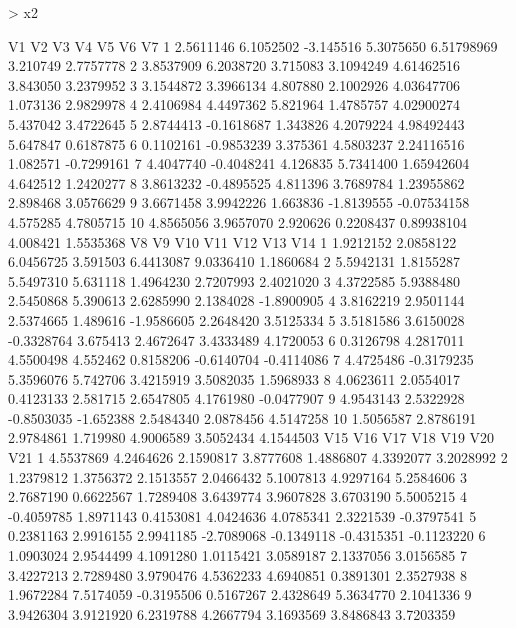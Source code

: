 \documentclass[12pt]{article}
\begin{document}
\begin{Schunk}
\begin{Sinput}
> x2
\end{Sinput}
\begin{Soutput}
          V1         V2        V3         V4          V5       V6         V7
1  2.5611146  6.1052502 -3.145516  5.3075650  6.51798969 3.210749  2.7757778
2  3.8537909  6.2038720  3.715083  3.1094249  4.61462516 3.843050  3.2379952
3  3.1544872  3.3966134  4.807880  2.1002926  4.03647706 1.073136  2.9829978
4  2.4106984  4.4497362  5.821964  1.4785757  4.02900274 5.437042  3.4722645
5  2.8744413 -0.1618687  1.343826  4.2079224  4.98492443 5.647847  0.6187875
6  0.1102161 -0.9853239  3.375361  4.5803237  2.24116516 1.082571 -0.7299161
7  4.4047740 -0.4048241  4.126835  5.7341400  1.65942604 4.642512  1.2420277
8  3.8613232 -0.4895525  4.811396  3.7689784  1.23955862 2.898468  3.0576629
9  3.6671458  3.9942226  1.663836 -1.8139555 -0.07534158 4.575285  4.7805715
10 4.8565056  3.9657070  2.920626  0.2208437  0.89938104 4.008421  1.5535368
          V8         V9        V10       V11        V12        V13        V14
1  1.9212152  2.0858122  6.0456725  3.591503  6.4413087  9.0336410  1.1860684
2  5.5942131  1.8155287  5.5497310  5.631118  1.4964230  2.7207993  2.4021020
3  4.3722585  5.9388480  2.5450868  5.390613  2.6285990  2.1384028 -1.8900905
4  3.8162219  2.9501144  2.5374665  1.489616 -1.9586605  2.2648420  3.5125334
5  3.5181586  3.6150028 -0.3328764  3.675413  2.4672647  3.4333489  4.1720053
6  0.3126798  4.2817011  4.5500498  4.552462  0.8158206 -0.6140704 -0.4114086
7  4.4725486 -0.3179235  5.3596076  5.742706  3.4215919  3.5082035  1.5968933
8  4.0623611  2.0554017  0.4123133  2.581715  2.6547805  4.1761980 -0.0477907
9  4.9543143  2.5322928 -0.8503035 -1.652388  2.5484340  2.0878456  4.5147258
10 1.5056587  2.8786191  2.9784861  1.719980  4.9006589  3.5052434  4.1544503
          V15       V16        V17        V18        V19        V20        V21
1   4.5537869 4.2464626  2.1590817  3.8777608  1.4886807  4.3392077  3.2028992
2   1.2379812 1.3756372  2.1513557  2.0466432  5.1007813  4.9297164  5.2584606
3   2.7687190 0.6622567  1.7289408  3.6439774  3.9607828  3.6703190  5.5005215
4  -0.4059785 1.8971143  0.4153081  4.0424636  4.0785341  2.3221539 -0.3797541
5   0.2381163 2.9916155  2.9941185 -2.7089068 -0.1349118 -0.4315351 -0.1123220
6   1.0903024 2.9544499  4.1091280  1.0115421  3.0589187  2.1337056  3.0156585
7   3.4227213 2.7289480  3.9790476  4.5362233  4.6940851  0.3891301  2.3527938
8   1.9672284 7.5174059 -0.3195506  0.5167267  2.4328649  5.3634770  2.1041336
9   3.9426304 3.9121920  6.2319788  4.2667794  3.1693569  3.8486843  3.7203359

\end{Soutput}
\end{Schunk}
\end{document}

